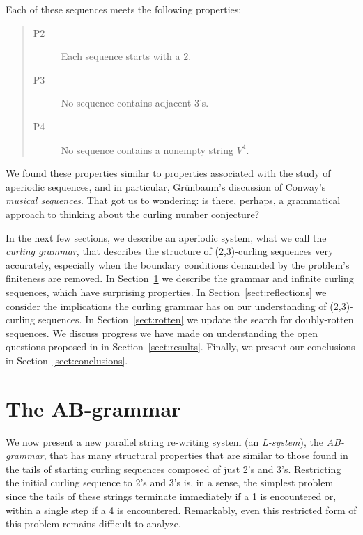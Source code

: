 \documentclass[11pt]{article}
\def\emph#1{{\em #1\/}}
\def\term#1{\emph{#1}}
\def\ni{\noindent}
\begin{document}
Each of these sequences meets the following properties:
\begin{quote}
\begin{description}
\item[P2] Each sequence starts with a $2$.
\item[P3] No sequence contains adjacent $3$'s.
\item[P4] No sequence contains a nonempty string $V^4$.
\end{description}
\end{quote}
\ni We found these properties similar to properties associated with the study
of aperiodic sequences, and in particular, Gr\"unbaum's discussion of Conway's
\term{musical sequences}.  That got us to wondering: is there, perhaps, a
grammatical approach to thinking about the curling number conjecture?

In the next few sections, we describe an aperiodic system, what we call the
\term{curling grammar}, that describes the structure of (2,3)-curling sequences very
accurately, especially when the boundary conditions demanded by the problem's
finiteness are removed.  In Section~\ref{sect:ABg} we describe the grammar
and infinite curling sequences, which have surprising properties.  In
Section~\ref{sect:reflections} we consider the implications the curling
grammar has on our understanding of (2,3)-curling sequences.
In Section~\ref{sect:rotten} we update the search for doubly-rotten sequences.
We discuss progress we have made on understanding the open questions proposed
in \cite{Ch13} in Section~\ref{sect:results}.  Finally, we present our
conclusions in Section~\ref{sect:conclusions}.

\section{The AB-grammar}\label{sect:ABg}
We now present a new parallel string re-writing system (an \term{L-system}), the \term{AB-grammar}, that has many structural properties
that are similar to those found in the tails of starting curling sequences
composed of just 2's and 3's. Restricting the initial curling sequence to 
2's and 3's is, in a sense, the simplest problem since the tails of these
strings terminate immediately if a 1 is encountered or, within a single step
if a 4 is encountered.  Remarkably, even this restricted form of this problem
remains difficult to analyze.
\end{document}
